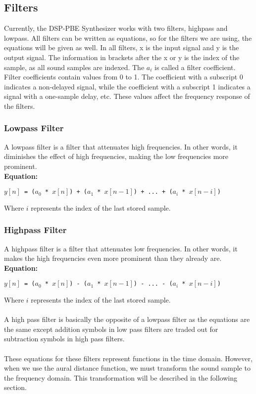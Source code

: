 \documentclass[english, 11pt]{article}
\begin{document}
\subsection{Filters}

Currently, the DSP-PBE Synthesizer works with two filters, highpass and lowpass. All filters can be written as equations, so for the filters we are using, the equations will be given as well. In all filters, x is the input signal and y is the output signal. The information in brackets after the x or y is the index of the sample, as all sound samples are indexed. The $a_i$ is called a filter coefficient. Filter coefficients contain values from 0 to 1. The coefficient with a subscript 0 indicates a non-delayed signal, while the coefficient with a subscript 1 indicates a signal with a one-sample delay, etc. These values affect the frequency response of the filters.

\subsubsection{Lowpass Filter}

A lowpass filter is a filter that attenuates high frequencies. In other words, it diminishes the effect of high frequencies, making the low frequencies more prominent. \\

\textbf{Equation:}

\texttt{$y[n]$ = ($a_0$ * $x[n]$) + ($a_1$ * $x[n-1]$) + ... + ($a_i$ * $x[n-i]$)}
\par Where \texttt{$i$} represents the index of the last stored sample.

\subsubsection{Highpass Filter}

A highpass filter is a filter that attenuates low frequencies. In other words, it makes the high frequencies even more prominent than they already are. \\ 

\textbf{Equation:}

\texttt{$y[n]$ = ($a_0$ * $x[n]$) - ($a_1$ * $x[n-1]$) - ... - ($a_i$ * $x[n-i]$)}
\par Where \texttt{$i$} represents the index of the last stored sample. \\ \\ 
A high pass filter is basically the opposite of a lowpass filter as the equations are the same except addition symbols in low pass filters are traded out for subtraction symbols in high pass filters. \\ \\
These equations for these filters represent functions in the time domain. However, when we use the aural distance function, we must transform the sound sample to the frequency domain. This transformation will be described in the following section.
\end{document}
